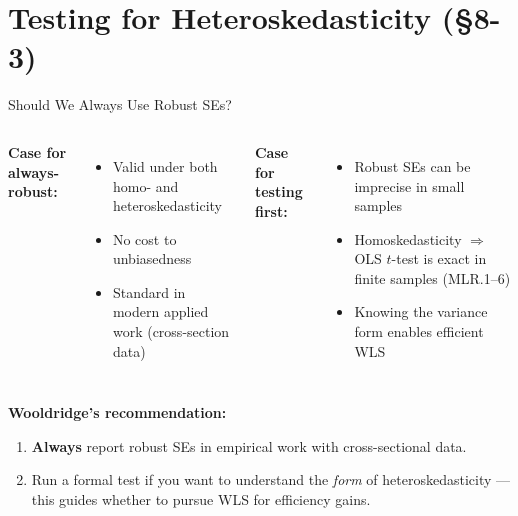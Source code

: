 \documentclass[aspectratio=169, 12pt]{beamer}
\begin{document}
\section{Testing for Heteroskedasticity (\S8-3)}

\begin{frame}{Should We Always Use Robust SEs?}

  \begin{columns}[t]
    \textbf{Case for always-robust:}
    \begin{itemize}
      \item Valid under both homo- and heteroskedasticity
      \item No cost to unbiasedness
      \item Standard in modern applied work (cross-section data)
    \end{itemize}

    \textbf{Case for testing first:}
    \begin{itemize}
      \item Robust SEs can be imprecise in small samples
      \item Homoskedasticity $\Rightarrow$ OLS $t$-test is exact in finite samples (MLR.1--6)
      \item Knowing the variance form enables efficient WLS
    \end{itemize}
  \end{columns}

  \smallskip

  \begin{keybox}
    \textbf{Wooldridge's recommendation:}
    \begin{enumerate}
      \item \textbf{Always} report robust SEs in empirical work with cross-sectional data.
      \item Run a formal test if you want to understand the \textit{form} of heteroskedasticity — this guides whether to pursue WLS for efficiency gains.
    \end{enumerate}
  \end{keybox}

\end{frame}
\end{document}
